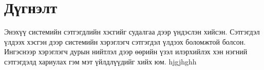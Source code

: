 \documentclass[12pt]{article}
\begin{document}
	
	\section{Дүгнэлт}
	\begin{itemize}
		Энэхүү системийн сэтгэгдлийн хэсгийг судалгаа дээр үндэслэн хийсэн. Сэтгэгдэл үлдээх хэсгэн дээр системийн хэрэглэгч сэтгэгдэл үлдээх боломжтой болсон. Ингэснээр хэрэглэгч дурын нийтлэл дээр өөрийн үзэл илэрхийлэх хэн нэгний сэтгэгдэлд хариулах гэм мэт үйлдлүүдийг хийх юм. 
		hjgjhghh
		
	\end{itemize}
	
	
	
	
\end{document}
